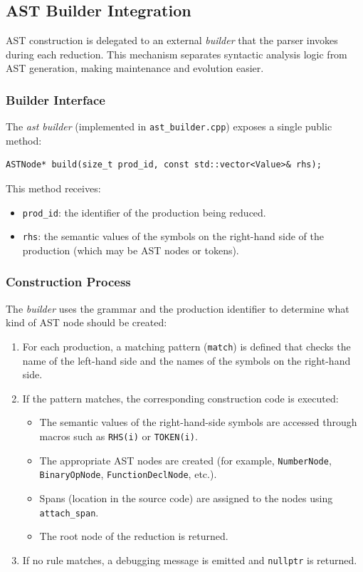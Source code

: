 \documentclass[12pt,a4paper]{report}
\begin{document}
\subsection{AST Builder Integration}

AST construction is delegated to an external \textit{builder} that the parser invokes during each reduction.
This mechanism separates syntactic analysis logic from AST generation, making maintenance and evolution easier.

\subsubsection{Builder Interface}
The \textit{ast builder} (implemented in \texttt{ast\_builder.cpp}) exposes a single public method:
\begin{verbatim}
ASTNode* build(size_t prod_id, const std::vector<Value>& rhs);
\end{verbatim}

This method receives:
\begin{itemize}
    \item \texttt{prod\_id}: the identifier of the production being reduced.
    \item \texttt{rhs}: the semantic values of the symbols on the right-hand side of the production (which may be AST nodes or tokens).
\end{itemize}

\subsubsection{Construction Process}
The \textit{builder} uses the grammar and the production identifier to determine what kind of AST node should be created:

\begin{enumerate}
    \item For each production, a matching pattern (\texttt{match}) is defined that checks the name of the left-hand side and the names of the symbols on the right-hand side.
    \item If the pattern matches, the corresponding construction code is executed:
        \begin{itemize}
            \item The semantic values of the right-hand-side symbols are accessed through macros such as \texttt{RHS(i)} or \texttt{TOKEN(i)}.
            \item The appropriate AST nodes are created (for example, \texttt{NumberNode}, \texttt{BinaryOpNode}, \texttt{FunctionDeclNode}, etc.).
            \item Spans (location in the source code) are assigned to the nodes using \texttt{attach\_span}.
            \item The root node of the reduction is returned.
        \end{itemize}
    \item If no rule matches, a debugging message is emitted and \texttt{nullptr} is returned.
\end{enumerate}
\end{document}
